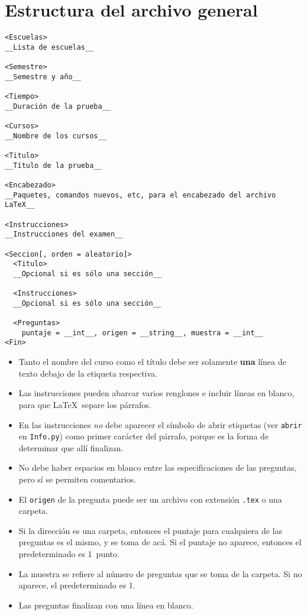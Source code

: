 \documentclass[12pt]{article}
\theoremstyle{definition}
\begin{document}
\section{Estructura del archivo general}
\begin{verbatim}
<Escuelas>
__Lista de escuelas__

<Semestre>
__Semestre y año__

<Tiempo>
__Duración de la prueba__

<Cursos>
__Nombre de los cursos__

<Titulo>
__Título de la prueba__

<Encabezado>
__Paquetes, comandos nuevos, etc, para el encabezado del archivo LaTeX__

<Instrucciones>
__Instrucciones del examen__

<Seccion[, orden = aleatorio]>
  <Titulo>
  __Opcional si es sólo una sección__

  <Instrucciones>
  __Opcional si es sólo una sección__

  <Preguntas>
    puntaje = __int__, origen = __string__, muestra = __int__
<Fin>
\end{verbatim}

\begin{itemize}
  \item Tanto el nombre del curso como el título debe ser solamente \textbf{una} línea de texto debajo de la etiqueta respectiva.
  \item Las instrucciones pueden abarcar varios renglones e incluir líneas en blanco, para que \LaTeX\ separe los párrafos. 
  \item En las instrucciones \emph{no} debe aparecer el símbolo de abrir etiquetas (ver \verb|abrir| en \verb|Info.py|) como primer carácter del párrafo, porque es la forma de determinar que allí finalizan.
  \item No debe haber espacios en blanco entre las especificaciones de las preguntas, pero sí se permiten comentarios.
  \item El \verb|origen| de la pregunta puede ser un archivo con extensión \verb|.tex| o una carpeta.
  \item Si la dirección es una carpeta, entonces el puntaje para cualquiera de las preguntas es el mismo, y se toma de acá. Si el puntaje no aparece, entonces el predeterminado es 1~punto.
  \item La muestra se refiere al n\'umero de preguntas que se toma de la carpeta. Si no aparece, el predeterminado es 1.
  \item Las preguntas finalizan con una línea en blanco.
\end{itemize}
\end{document}
